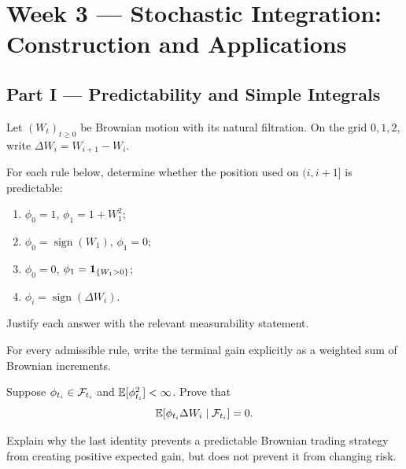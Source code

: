 
\section{Week 3 --- Stochastic Integration: Construction and Applications}


\subsection*{Part I --- Predictability and Simple Integrals}

\begin{exercise}
Let \((W_t)_{t\geq0}\) be Brownian motion with its natural filtration. On the
grid \(0,1,2\), write \(\Delta W_i=W_{i+1}-W_i\).
\begin{exparts}
  \item For each rule below, determine whether the position used on
  \((i,i+1]\) is predictable:
  \begin{enumerate}[label=(\roman*),leftmargin=2.4em,itemsep=0.1em]
    \item \(\phi_0=1\), \(\phi_1=1+W_1^2\);
    \item \(\phi_0=\operatorname{sign}(W_1)\), \(\phi_1=0\);
    \item \(\phi_0=0\), \(\phi_1=\mathbf{1}_{\{W_1>0\}}\);
    \item \(\phi_i=\operatorname{sign}(\Delta W_i)\).
  \end{enumerate}
  Justify each answer with the relevant measurability statement.
  \item For every admissible rule, write the terminal gain explicitly as a
  weighted sum of Brownian increments.
  \item Suppose \(\phi_{t_i}\in\mathcal{F}_{t_i}\) and
  \(\mathbb{E}[\phi_{t_i}^2]<\infty\). Prove that
  \[
  \mathbb{E}[\phi_{t_i}\Delta W_i\mid\mathcal{F}_{t_i}]=0.
  \]
  \item Explain why the last identity prevents a predictable Brownian trading
  strategy from creating positive expected gain, but does not prevent it from
  changing risk.
\end{exparts}
\end{exercise}


